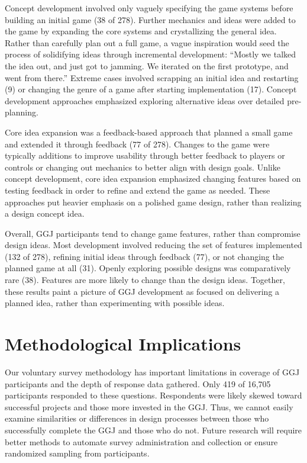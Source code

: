 \documentclass{sig-alternate}
\begin{document}
Concept development involved only vaguely specifying the game systems before building an initial game (38 of 278). Further mechanics and ideas were added to the game by expanding the core systems and crystallizing the general idea.
Rather than carefully plan out a full game, a vague inspiration would seed the process of solidifying ideas through incremental development: ``Mostly we talked the idea out, and just got to jamming. We iterated on the first prototype, and went from there.''
Extreme cases involved scrapping an initial idea and restarting (9) or changing the genre of a game after starting implementation (17). Concept development approaches emphasized exploring alternative ideas over detailed pre-planning.

Core idea expansion was a feedback-based approach that planned a small game and extended it through feedback (77 of 278). Changes to the game were typically additions to improve usability through better feedback to players or controls or changing out mechanics to better align with design goals. Unlike concept development, core idea expansion emphasized changing features based on testing feedback in order to refine and extend the game as needed. These approaches put heavier emphasis on a polished game design, rather than realizing a design concept idea.

Overall, GGJ participants tend to change game features, rather than compromise design ideas. Most development involved reducing the set of features implemented (132 of 278), refining initial ideas through feedback (77), or not changing the planned game at all (31). Openly exploring possible designs was comparatively rare (38). Features are more likely to change than the design ideas. Together, these results paint a picture of GGJ development as focused on delivering a planned idea, rather than experimenting with possible ideas.

\section{Methodological Implications}
Our voluntary survey methodology has important limitations in coverage of GGJ participants and the depth of response data gathered. Only 419 of 16,705 participants responded to these questions. Respondents were likely skewed toward successful projects and those more invested in the GGJ. Thus, we cannot easily examine similarities or differences in design processes between those who successfully complete the GGJ and those who do not. Future research will require better methods to automate survey administration and collection or ensure randomized sampling from participants.
\end{document}

